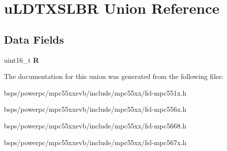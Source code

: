\hypertarget{unionuLDTXSLBR}{}\section{u\+L\+D\+T\+X\+S\+L\+BR Union Reference}
\label{unionuLDTXSLBR}
\subsection*{Data Fields}
\begin{DoxyCompactItemize}
\item 
\mbox{\label{unionuLDTXSLBR_a67106c14f16d71ac9ba21804f25c2f15}} 
uint16\+\_\+t {\bfseries R}
\end{DoxyCompactItemize}


The documentation for this union was generated from the following files\+:\begin{DoxyCompactItemize}
\item 
bsps/powerpc/mpc55xxevb/include/mpc55xx/fsl-\/mpc551x.\+h\item 
bsps/powerpc/mpc55xxevb/include/mpc55xx/fsl-\/mpc556x.\+h\item 
bsps/powerpc/mpc55xxevb/include/mpc55xx/fsl-\/mpc5668.\+h\item 
bsps/powerpc/mpc55xxevb/include/mpc55xx/fsl-\/mpc567x.\+h\end{DoxyCompactItemize}
